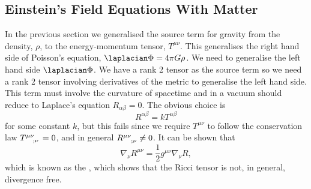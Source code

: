 \documentclass[fleqn]{NotesClass}
\newcommand*{\covariantDerivative}[1]{\nabla_{\!#1}}
\begin{document}
    \subsection{Einstein's Field Equations With Matter}
    In the previous section we generalised the source term for gravity from the density, \(\rho\), to the energy-momentum tensor, \(T^{\mu\nu}\).
    This generalises the right hand side of Poisson's equation, \(\laplacian \Phi = 4\pi G\rho\).
    We need to generalise the left hand side \(\laplacian\Phi\).
    We have a rank 2 tensor as the source term so we need a rank 2 tensor involving derivatives of the metric to generalise the left hand side.
    This term must involve the curvature of spacetime and in a vacuum should reduce to Laplace's equation \(R_{\alpha\beta} = 0\).
    The obvious choice is 
    \begin{equation}
        R^{\alpha\beta} = k T^{\alpha\beta}
    \end{equation}
    for some constant \(k\), but this fails since we require \(T^{\mu\nu}\) to follow the conservation law \(\tensor{T}{^{\mu\nu}_{;\nu}} = 0\), and in general \(\tensor{R}{^{\mu\nu}_{;\nu}} \ne 0\).
    It can be shown that
    \begin{equation}
        \covariantDerivative{\nu} R^{\mu\nu} = \frac{1}{2} g^{\mu\nu}\covariantDerivative{\nu} R,
    \end{equation}
    which is known as the , which shows that the Ricci tensor is not, in general, divergence free.
    
\end{document}
